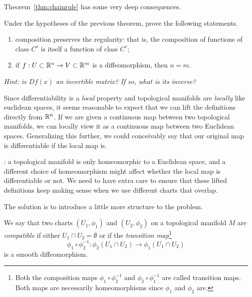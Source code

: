 \begin{remark}
Theorem~\ref{thm:chainrule} has some very deep consequences.
\begin{exercise}
  Under the hypotheses of the previous theorem, prove the following statements.
  \begin{enumerate}
    \item composition preserves the regularity: that is, the composition of functions of class $C^r$ is itself a function of class $C^r$;
    \item if $f:U\subset\mathbb{R}^n\to V\subset\mathbb{R}^m$ is a diffeomorphism, then $n=m$.
  \end{enumerate}
  \textit{\small Hint: is $Df(x)$ an invertible matrix? If so, what is its inverse?} %
\end{exercise}
\end{remark}

Since differentiability is a \emph{local} property and topological manifolds are \emph{locally} like euclidean spaces, it seems reasonable to expect that we can lift the definitions directly from $\mathbb{R}^n$.
If we are given a continuous map between two topological manifolds, we can locally view it as a continuous map between two Euclidean spaces.
Generalizing this further, we could conceivably say that our original map is differentiable if the local map is.

: a topological manifold is only homeomorphic to a Euclidean space, and a different choice of homeomorphism might affect whether the local map is differentiable or not.
We need to have extra care to ensure that these lifted definitions keep making sense when we use different charts that overlap.

The solution is to introduce a little more structure to the problem.

\begin{definition}\label{def:crcomp}
We say that two charts $(U_1, \phi_1)$ and $(U_2, \phi_2)$ on a topological manifold $M$ are \emph{compatible} if either $U_1 \cap U_2 = \emptyset$ or if the \emph{transition map}\footnote{Both the composition maps $\phi_1 \circ \phi_2^{-1}$ and $\phi_2 \circ \phi_1^{-1}$ are called transition maps. Both maps are necessarily homeomorphisms since $\phi_1$ and $\phi_2$ are.}
\begin{equation}
  \phi_1 \circ \phi_2^{-1} : \phi_2(U_1\cap U_2) \to \phi_1(U_1 \cap U_2)
\end{equation}
is a smooth diffeomorphism.
\end{definition}

